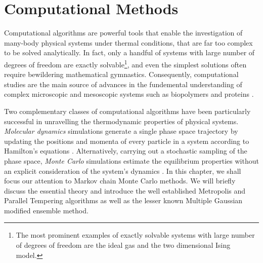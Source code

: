 \documentclass[12pt]{report}
\begin{document}

\chapter{Computational Methods}

Computational algorithms are powerful tools that enable the investigation of  many-body physical systems under thermal conditions, that are far too complex to be solved analytically.
In fact, only a handful of systems with large number of degrees of freedom are exactly solvable\footnote{The most prominent examples of exactly solvable systems with large number of degrees of freedom are the ideal gas and the two dimensional Ising model.}, and even the simplest solutions often require bewildering mathematical gymnastics. Consequently, computational studies are the main source of advances in the fundemental understanding of complex microscopic and mesoscopic systems such as biopolymers and proteins \cite{Bachmann2014}.

Two complementary classes of computational algorithms have been particularly successful in unravelling the thermodynamic properties of physical systems. \textit{Molecular dynamics} simulations generate a single phase space trajectory by updating the positions and momenta of every particle in a system according to Hamilton's equations \cite{Rapaport2004,Tuckerman2010}. Alternatively, carrying out a stochastic sampling of the phase space, \textit{Monte Carlo} simulations estimate the equilibrium properties without an explicit consideration of the system's dynamics \cite{Bachmann2014, Landau2000}. In this chapter, we shall focus our attention to Markov chain Monte Carlo methods. We will briefly discuss the essential theory and introduce the well established Metropolis and Parallel Tempering algorithms as well as the lesser known Multiple Gaussian modified ensemble method.
\end{document}
